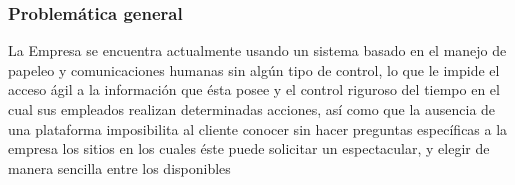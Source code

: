 \subsubsection{Problemática general}
La Empresa se encuentra actualmente usando un sistema basado en el manejo de papeleo y comunicaciones humanas sin algún tipo de control, lo que le impide el acceso ágil a la información que ésta posee y el control riguroso del tiempo en el cual sus empleados realizan determinadas acciones, así como que la ausencia de una plataforma imposibilita al cliente conocer sin hacer preguntas específicas a la empresa los sitios en los cuales éste puede solicitar un espectacular, y elegir de manera sencilla entre los disponibles